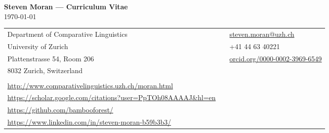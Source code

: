 \documentclass[11pt]{article}
\begin{document}
\pagestyle{empty}


\begin{center}
{\large \bf Steven Moran --- Curriculum Vitae}\\
\today\\

\vskip 12pt
\begin{tabular}{lll}
Department of Comparative Linguistics & & \href{mailto:steven.moran@uzh.ch}{steven.moran@uzh.ch} \\
University of Zurich & & +41 44 63 40221 \\
Plattenstrasse 54, Room 206 & & \small\url{orcid.org/0000-0002-3969-6549} \\
8032 Zurich, Switzerland & & \\
& & \\
\small\url{http://www.comparativelinguistics.uzh.ch/moran.html} & & \\
\small\url{https://scholar.google.com/citations?user=PpTOh08AAAAJ&hl=en} & & \\
\small\url{https://github.com/bambooforest/} & & \\
\small\url{https://www.linkedin.com/in/steven-moran-b59b3b3/} & & \
\end{tabular}
\end{center}

% 

\begin{comment}
\vskip 12pt
\begin{tabular}{lll}
Birthdate: 09.09.1979 && \\
Marital status: Single && \\
Nationality: USA && \\
Email: stiv@uw.edu && \\
Department of Linguistics & &\\
University of Washington & &\\
Box 354340 && \\
Seattle, WA 98195--4340 & & \\
\end{tabular}
\end{center}
\end{comment}
\end{document}
